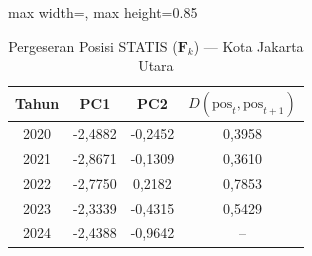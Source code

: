 \begin{table}[H]
\centering
\caption{Pergeseran Posisi STATIS ($\mathbf{F}_k$) --- Kota Jakarta Utara} \label{tab:app2jarak_statis_skor_kota_jakarta_utara}
\begin{adjustbox}{max width=\textwidth, max height=0.85\textheight}
\begin{tabular}{|c|c|c|c|}
\hline
\textbf{Tahun} & \textbf{PC1} & \textbf{PC2} & \textbf{$D(\text{pos}_t, \text{pos}_{t+1})$} \\
\hline
2020 & -2,4882 & -0,2452 & 0,3958 \\
2021 & -2,8671 & -0,1309 & 0,3610 \\
2022 & -2,7750 & 0,2182 & 0,7853 \\
2023 & -2,3339 & -0,4315 & 0,5429 \\
2024 & -2,4388 & -0,9642 & -- \\
\hline
\end{tabular}
\end{adjustbox}
\end{table}